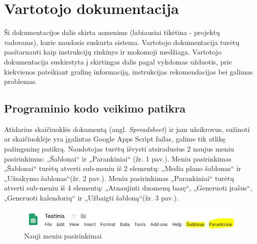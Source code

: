 

\pagebreak
\section{Vartotojo dokumentacija}
Ši dokumentacijos dalis skirta asmenims (labiausiai tikėtina - projektų vadovams), kurie naudosis suskurta sistema. Vartotojo dokumentacija turėtų pasitarnauti kaip instrukcijų rinkinys ir mokomoji medžiaga. Vartotojo dokumentacija suskirstyta į skirtingas dalis pagal vykdomas užduotis, prie kiekvienos pateikiant grafinę informaciją, instrukcijas rekomendacijas bei galimas problemas.

\subsection{Programinio kodo veikimo patikra}
Atidarius skaičiuoklės dokumentą (angl. \textit{Spreadsheet}) ir jam užsikrovus, sužinoti ar skaičiuoklėje yra įgalintas Google Apps Script failas, galime tik atlikę pažingsninę patikrą. Naudotojas turėtų išvysti atsiradusius 2 naujus meniu pasirinkimus: „Šablonai“ ir „Parankiniai“ (žr. 1 pav.). Meniu pasirinkimas „Šablonai“ turėtų atverti sub-meniu iš 2 elementų: „Media plano šablonas“ ir „Užsakymo šablonas“(žr. 2 pav.). Meniu pasirinkimas „Parankiniai“ turėtų atverti sub-meniu iš 4 elementų: „Atnaujinti duomenų bazę“, „Generuoti įrašus“, „Generuoti kalendorių“ ir „Užbaigti šabloną“(žr. 3 pav.).

\begin{figure}[H]
    \centering
    \includegraphics[scale=0.9]{Images/Screenshots/menu-options.PNG}
    \caption{Nauji meniu pasirinkimai}
    \label{img:model}
\end{figure}


